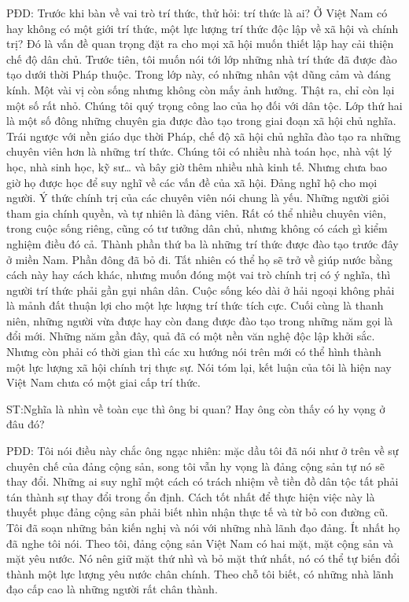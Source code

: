PĐD: Trước khi bàn về vai trò trí thức, thử hỏi: trí thức là ai? Ở Việt Nam có hay không có một giới trí thức, một lực lượng trí thức độc lập về xã hội và chính trị? Đó là vấn đề quan trọng đặt ra cho mọi xã hội muốn thiết lập hay cải thiện chế độ dân chủ. Trước tiên, tôi muốn nói tới lớp những nhà trí thức đã được đào tạo dưới thời Pháp thuộc. Trong lớp này, có những nhân vật dũng cảm và đáng kính. Một vài vị còn sống nhưng không còn mấy ảnh hưởng. Thật ra, chỉ còn lại một số rất nhỏ. Chúng tôi quý trọng công lao của họ đối với dân tộc. Lớp thứ hai là một số đông những chuyên gia được đào tạo trong giai đoạn xã hội chủ nghĩa. Trái ngược với nền giáo dục thời Pháp, chế độ xã hội chủ nghĩa đào tạo ra những chuyên viên hơn là những trí thức. Chúng tôi có nhiều nhà toán học, nhà vật lý học, nhà sinh học, kỹ sư… và bây giờ thêm nhiều nhà kinh tế. Nhưng chưa bao giờ họ được học để suy nghĩ về các vấn đề của xã hội. Đảng nghĩ hộ cho mọi người. Ý thức chính trị của các chuyên viên nói chung là yếu. Những người giỏi tham gia chính quyền, và tự nhiên là đảng viên. Rất có thể nhiều chuyên viên, trong cuộc sống riêng, cũng có tư tưởng dân chủ, nhưng không có cách gì kiểm nghiệm điều đó cả. Thành phần thứ ba là những trí thức được đào tạo trước đây ở miền Nam. Phần đông đã bỏ đi. Tất nhiên có thể họ sẽ trở về giúp nước bằng cách này hay cách khác, nhưng muốn đóng một vai trò chính trị có ý nghĩa, thì người trí thức phải gần gụi nhân dân. Cuộc sống kéo dài ở hải ngoại không phải là mảnh đất thuận lợi cho một lực lượng trí thức tích cực. Cuối cùng là thanh niên, những người vừa được hay còn đang được đào tạo trong những năm gọi là đổi mới. Những năm gần đây, quả đã có một nền văn nghệ độc lập khởi sắc. Nhưng còn phải có thời gian thì các xu hướng nói trên mới có thể hình thành một lực lượng xã hội chính trị thực sự. Nói tóm lại, kết luận của tôi là hiện nay Việt Nam chưa có một giai cấp trí thức.

ST:Nghĩa là nhìn về toàn cục thì ông bi quan? Hay ông còn thấy có hy vọng ở đâu đó?

PĐD: Tôi nói điều này chắc ông ngạc nhiên: mặc dầu tôi đã nói như ở trên về sự chuyên chế của đảng cộng sản, song tôi vẫn hy vọng là đảng cộng sản tự nó sẽ thay đổi. Những ai suy nghĩ một cách có trách nhiệm về tiền đồ dân tộc tất phải tán thành sự thay đổi trong ổn định. Cách tốt nhất để thực hiện việc này là thuyết phục đảng cộng sản phải biết nhìn nhận thực tế và từ bỏ con đường cũ. Tôi đã soạn những bản kiến nghị và nói với những nhà lãnh đạo đảng. Ít nhất họ đã nghe tôi nói. Theo tôi, đảng cộng sản Việt Nam có hai mặt, mặt cộng sản và mặt yêu nước. Nó nên giữ mặt thứ nhì và bỏ mặt thứ nhất, nó có thể tự biến đổi thành một lực lượng yêu nước chân chính. Theo chỗ tôi biết, có những nhà lãnh đạo cấp cao là những người rất chân thành.

